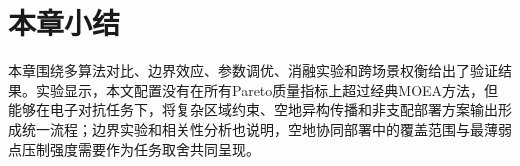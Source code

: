 
\section{本章小结}

本章围绕多算法对比、边界效应、参数调优、消融实验和跨场景权衡给出了验证结果。实验显示，本文配置没有在所有Pareto质量指标上超过经典MOEA方法，但能够在电子对抗任务下，将复杂区域约束、空地异构传播和非支配部署方案输出形成统一流程；边界实验和相关性分析也说明，空地协同部署中的覆盖范围与最薄弱点压制强度需要作为任务取舍共同呈现。

